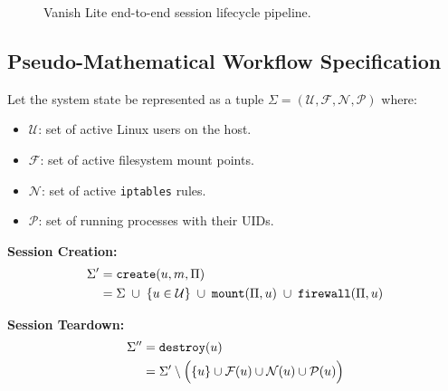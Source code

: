 \begin{figure}[H]
    \centering
    \caption{Vanish Lite end-to-end session lifecycle pipeline.}
    \label{fig:pipeline}
\end{figure}

\subsection{Pseudo-Mathematical Workflow Specification}

Let the system state be represented as a tuple $\Sigma = (\mathcal{U}, \mathcal{F}, \mathcal{N}, \mathcal{P})$ where:
\begin{itemize}
    \item $\mathcal{U}$: set of active Linux users on the host.
    \item $\mathcal{F}$: set of active filesystem mount points.
    \item $\mathcal{N}$: set of active \texttt{iptables} rules.
    \item $\mathcal{P}$: set of running processes with their UIDs.
\end{itemize}

\noindent\textbf{Session Creation:}
\begin{align}
    \Sigma' &= \texttt{create}(u, m, \Pi) \notag \\
    &= \Sigma \;\cup\; \{u \in \mathcal{U}\} \;\cup\; \texttt{mount}(\Pi, u) \;\cup\; \texttt{firewall}(\Pi, u)
\end{align}

\noindent\textbf{Session Teardown:}
\begin{align}
    \Sigma'' &= \texttt{destroy}(u) \notag \\
    &= \Sigma' \setminus \Big( \{u\} \cup \mathcal{F}(u) \cup \mathcal{N}(u) \cup \mathcal{P}(u) \Big)
\end{align}

